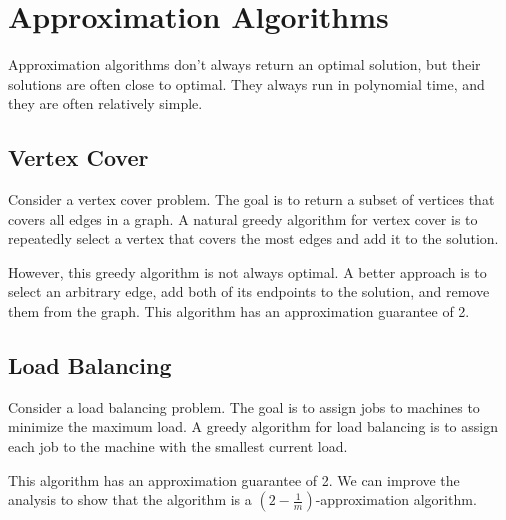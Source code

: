 \documentclass[11pt]{article}
\begin{document}
\section{Approximation Algorithms}

Approximation algorithms don't always return an optimal solution, but their solutions are often close to optimal. They always run in polynomial time, and they are often relatively simple.

\subsection{Vertex Cover}

Consider a vertex cover problem. The goal is to return a subset of vertices that covers all edges in a graph. A natural greedy algorithm for vertex cover is to repeatedly select a vertex that covers the most edges and add it to the solution.

However, this greedy algorithm is not always optimal. A better approach is to select an arbitrary edge, add both of its endpoints to the solution, and remove them from the graph. This algorithm has an approximation guarantee of 2.

\subsection{Load Balancing}

Consider a load balancing problem. The goal is to assign jobs to machines to minimize the maximum load. A greedy algorithm for load balancing is to assign each job to the machine with the smallest current load.

This algorithm has an approximation guarantee of 2. We can improve the analysis to show that the algorithm is a $(2 - \frac{1}{m})$-approximation algorithm.
\end{document}
